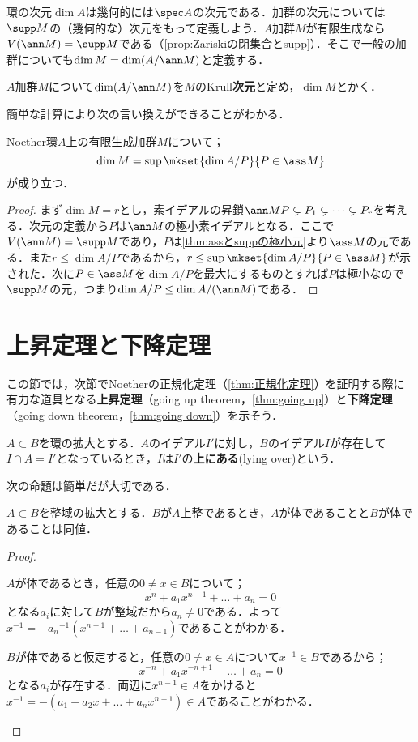 環の次元$\dim A$は幾何的には$\spec A$の次元である．加群の次元については$\supp M$の（幾何的な）次元をもって定義しよう．$A$加群$M$が有限生成なら$V(\ann M)=\supp M$である（\ref{prop:Zariskiの閉集合とsupp}）．そこで一般の加群についても$\dim M=\dim (A/\ann M)$と定義する．

\begin{defi}[加群のKrull次元]
	$A$加群$M$について$\dim (A/\ann M)$を$M$のKrull\textbf{次元}と定め，$\dim M$とかく．
\end{defi}

簡単な計算により次の言い換えができることがわかる．

\begin{prop}
	Noether環$A$上の有限生成加群$M$について；
	\[\dim M=\sup\mkset{\dim A/P}{P\in\ass M}\]
	が成り立つ．
\end{prop}
\begin{proof}
	まず$\dim M=r$とし，素イデアルの昇鎖$\ann M P\subsetneq P_1\subsetneq\dots\subsetneq P_r$を考える．次元の定義から$P$は$\ann M$の極小素イデアルとなる．ここで$V(\ann M)=\supp M$であり，$P$は\ref{thm:assとsuppの極小元}より$\ass M$の元である．また$r\leq \dim A/P$であるから，$r\leq\sup\mkset{\dim A/P}{P\in\ass M}$が示された．次に$P\in\ass M$を$\dim A/P$を最大にするものとすれば$P$は極小なので$\supp M$の元，つまり$\dim A/P\leq\dim A/(\ann M)$である．
\end{proof}

\section{上昇定理と下降定理}
この節では，次節でNoetherの正規化定理（\ref{thm:正規化定理}）を証明する際に有力な道具となる\textbf{上昇定理}（going up theorem，\ref{thm:going up}）と\textbf{下降定理}（going down theorem，\ref{thm:going down}）を示そう．

\begin{defi}
	$A\subset B$を環の拡大とする．$A$のイデアル$I'$に対し，$B$のイデアル$I$が存在して$I\cap A=I'$となっているとき，$I$は$I'$の\textbf{上にある}(lying over)という．
\end{defi}

次の命題は簡単だが大切である．
\begin{prop}\label{prop:整域の整拡大と体}
	$A\subset B$を整域の拡大とする．$B$が$A$上整であるとき，$A$が体であることと$B$が体であることは同値．
\end{prop}

\begin{proof}
	\begin{eqv}
		\item $A$が体であるとき，任意の$0\neq x\in B$について；
		\[x^n+a_1x^{n-1}+\dots+a_n=0\]
		となる$a_i$に対して$B$が整域だから$a_n\neq0$である．よって$x^{-1}=-{a_n}^{-1}(x^{n-1}+\dots+a_{n-1})$であることがわかる．
		
		\item $B$が体であると仮定すると，任意の$0\neq x\in A$について$x^{-1}\in B$であるから；
		\[x^{-n}+a_1x^{-n+1}+\dots+a_n=0\]
		となる$a_i$が存在する．両辺に$x^{n-1}\in A$をかけると$x^{-1}=-(a_1+a_2x+\dots+a_nx^{n-1})\in A$であることがわかる．
	\end{eqv}
\end{proof}

